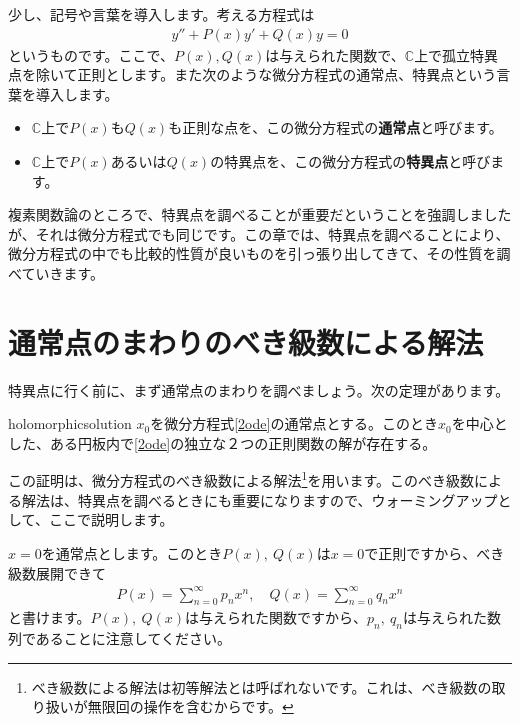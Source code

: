 \documentclass[report,paper=a4, fontsize=12pt, line_length=16cm, number_of_lines=33,dvipdfmx]{jlreq}
\numberwithin{equation}{section}
\newcommand{\Cb}{\mathbb{C}}
\newcommand{\strong}[1]{\textsf{\bfseries #1}}
\begin{document}
少し、記号や言葉を導入します。考える方程式は
\begin{align}
  y''+P(x)y'+Q(x)y=0\label{2ode}
\end{align}
というものです。ここで、$P(x),Q(x)$は与えられた関数で、$\Cb$上で孤立特異点を除いて正則とします。また次のような微分方程式の通常点、特異点という言葉を導入します。
\begin{itemize}
  \item $\Cb$上で$P(x)$も$Q(x)$も正則な点を、この微分方程式の\strong{通常点}と呼びます。
  \item $\Cb$上で$P(x)$あるいは$Q(x)$の特異点を、この微分方程式の\strong{特異点}と呼びます。
\end{itemize}

複素関数論のところで、特異点を調べることが重要だということを強調しましたが、それは微分方程式でも同じです。この章では、特異点を調べることにより、微分方程式の中でも比較的性質が良いものを引っ張り出してきて、その性質を調べていきます。

\section{通常点のまわりのべき級数による解法}
特異点に行く前に、まず通常点のまわりを調べましょう。次の定理があります。
\begin{theor}{}{holomorphicsolution}
  $x_0$を微分方程式\eqref{2ode}の通常点とする。このとき$x_0$を中心とした、ある円板内で\eqref{2ode}の独立な２つの正則関数の解が存在する。
\end{theor}

この証明は、微分方程式のべき級数による解法\footnote{べき級数による解法は初等解法とは呼ばれないです。これは、べき級数の取り扱いが無限回の操作を含むからです。}を用います。このべき級数による解法は、特異点を調べるときにも重要になりますので、ウォーミングアップとして、ここで説明します。

$x=0$を通常点とします。このとき$P(x),\ Q(x)$は$x=0$で正則ですから、べき級数展開できて
\begin{align}
  P(x)=\sum_{n=0}^{\infty}p_{n}x^n,\quad
  Q(x)=\sum_{n=0}^{\infty}q_{n}x^n
\end{align}
と書けます。$P(x),\ Q(x)$は与えられた関数ですから、$p_n,\ q_n$は与えられた数列であることに注意してください。
\end{document}
